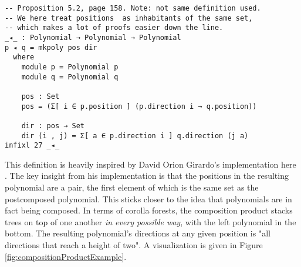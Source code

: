 \begin{verbatim}
-- Proposition 5.2, page 158. Note: not same definition used. 
-- We here treat positions  as inhabitants of the same set, 
-- which makes a lot of proofs easier down the line.
_◂_ : Polynomial → Polynomial → Polynomial
p ◂ q = mkpoly pos dir
  where
    module p = Polynomial p
    module q = Polynomial q

    pos : Set
    pos = (Σ[ i ∈ p.position ] (p.direction i → q.position))

    dir : pos → Set
    dir (i , j) = Σ[ a ∈ p.direction i ] q.direction (j a)
infixl 27 _◂_
\end{verbatim}

This definition is heavily inspired by David Orion Girardo's implementation here \cite{daig}. The key insight from his implementation is that the positions in the resulting polynomial are a pair, the first element of which is the same set as the postcomposed polynomial. This sticks closer to the idea that polynomials are in fact being composed. In terms of corolla forests, the composition product stacks trees on top of one another \textit{in every possible way}, with the left polynomial in the bottom. The resulting polynomial's directions at any given position is "all directions that reach a height of two". A visualization is given in Figure \ref{fig:compositionProductExample}.

